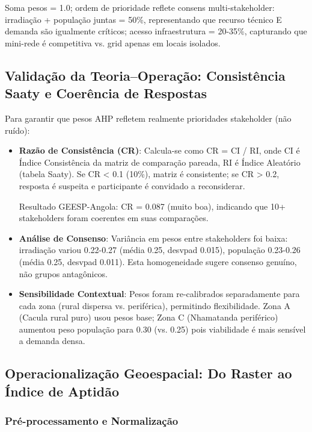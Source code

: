 \documentclass[12pt, a4paper]{article}
\begin{document}
Soma pesos = 1.0; ordem de prioridade reflete consens multi-stakeholder: irradiação + população juntas = 50\%, representando que recurso técnico E demanda são igualmente críticos; acesso infraestrutura = 20-35\%, capturando que mini-rede é competitiva vs. grid apenas em locais isolados.

\subsection{Validação da Teoria--Operação: Consistência Saaty e Coerência de Respostas}

Para garantir que pesos AHP refletem realmente prioridades stakeholder (não ruído):

\begin{itemize}
\item \textbf{Razão de Consistência (CR)}: Calcula-se como CR = CI / RI, onde CI é Índice Consistência da matriz de comparação pareada, RI é Índice Aleatório (tabela Saaty). Se CR < 0.1 (10\%), matriz é consistente; se CR > 0.2, resposta é suspeita e participante é convidado a reconsiderar.

Resultado GEESP-Angola: CR = 0.087 (muito boa), indicando que 10+ stakeholders foram coerentes em suas comparações.

\item \textbf{Análise de Consenso}: Variância em pesos entre stakeholders foi baixa: irradiação variou 0.22-0.27 (média 0.25, desvpad 0.015), população 0.23-0.26 (média 0.25, desvpad 0.011). Esta homogeneidade sugere consenso genuíno, não grupos antagônicos.

\item \textbf{Sensibilidade Contextual}: Pesos foram re-calibrados separadamente para cada zona (rural dispersa vs. periférica), permitindo flexibilidade. Zona A (Cacula rural puro) usou pesos base; Zona C (Nhamatanda periférico) aumentou peso população para 0.30 (vs. 0.25) pois viabilidade é mais sensível a demanda densa.
\end{itemize}

\subsection{Operacionalização Geoespacial: Do Raster ao Índice de Aptidão}

\subsubsection{Pré-processamento e Normalização}
\end{document}

